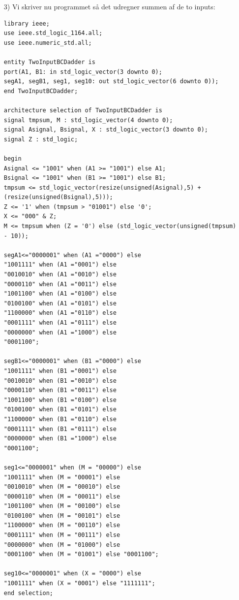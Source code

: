\begin{enumerate}
\item[3)]
Vi skriver nu programmet så det udregner summen af de to inputs:
		\begin{lstlisting}[caption={To-input BCD adder},label={lst:TwoInputBCDAdder}]
library ieee;
use ieee.std_logic_1164.all;
use ieee.numeric_std.all;

entity TwoInputBCDadder is
port(A1, B1: in std_logic_vector(3 downto 0);
segA1, segB1, seg1, seg10: out std_logic_vector(6 downto 0));
end TwoInputBCDadder;

architecture selection of TwoInputBCDadder is
signal tmpsum, M : std_logic_vector(4 downto 0);
signal Asignal, Bsignal, X : std_logic_vector(3 downto 0);
signal Z : std_logic;

begin
Asignal <= "1001" when (A1 >= "1001") else A1;
Bsignal <= "1001" when (B1 >= "1001") else B1;
tmpsum <= std_logic_vector(resize(unsigned(Asignal),5) + (resize(unsigned(Bsignal),5)));
Z <= '1' when (tmpsum > "01001") else '0';
X <= "000" & Z;
M <= tmpsum when (Z = '0') else (std_logic_vector(unsigned(tmpsum) - 10));

segA1<="0000001" when (A1 ="0000") else
"1001111" when (A1 ="0001") else
"0010010" when (A1 ="0010") else
"0000110" when (A1 ="0011") else
"1001100" when (A1 ="0100") else
"0100100" when (A1 ="0101") else
"1100000" when (A1 ="0110") else
"0001111" when (A1 ="0111") else
"0000000" when (A1 ="1000") else
"0001100";

segB1<="0000001" when (B1 ="0000") else
"1001111" when (B1 ="0001") else
"0010010" when (B1 ="0010") else
"0000110" when (B1 ="0011") else
"1001100" when (B1 ="0100") else
"0100100" when (B1 ="0101") else
"1100000" when (B1 ="0110") else
"0001111" when (B1 ="0111") else
"0000000" when (B1 ="1000") else
"0001100";

seg1<="0000001" when (M = "00000") else
"1001111" when (M = "00001") else
"0010010" when (M = "00010") else
"0000110" when (M = "00011") else
"1001100" when (M = "00100") else
"0100100" when (M = "00101") else
"1100000" when (M = "00110") else
"0001111" when (M = "00111") else
"0000000" when (M = "01000") else
"0001100" when (M = "01001") else "0001100";

seg10<="0000001" when (X = "0000") else
"1001111" when (X = "0001") else "1111111";
end selection;
		\end{lstlisting}
		

\end{enumerate}
